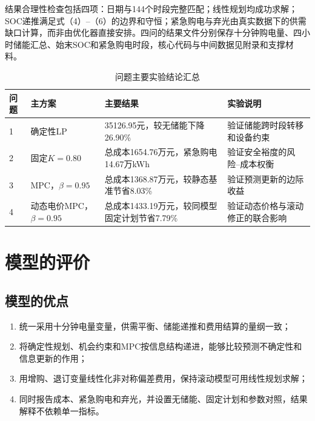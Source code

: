 \documentclass{cumcmthesis}
\begin{document}
结果合理性检查包括四项：日期与144个时段完整匹配；线性规划均成功求解；SOC递推满足式（4）--（6）的边界和守恒；紧急购电与弃光由真实数据下的供需缺口计算，而非由优化器直接安排。四问的结果文件分别保存十分钟购电量、四小时储能汇总、始末SOC和紧急购电时段，核心代码与中间数据见附录和支撑材料。


\begin{table}[H]
\centering
\normalsize
\setlength{\tabcolsep}{8pt}
\renewcommand\arraystretch{1.25}
\caption{问题主要实验结论汇总}
\label{tab:overallresult}
\begin{tabular}{p{1.0cm}p{2.8cm}p{4.1cm}p{4.1cm}}
\toprule
\textbf{问题} & \textbf{主方案} & \textbf{主要结果} & \textbf{实验说明}\\
\midrule
1 & 确定性LP
& 35126.95元，较无储能下降26.90\%
& 验证储能跨时段转移和设备约束\\

2 & 固定$K=0.80$
& 总成本1654.76万元，紧急购电14.67万kWh
& 验证安全裕度的风险--成本权衡\\

3 & MPC，$\beta=0.95$
& 总成本1368.87万元，较静态基准节省8.03\%
& 验证预测更新的边际收益\\

4 & 动态电价MPC，$\beta=0.95$
& 总成本1433.19万元，较同模型固定计划节省7.79\%
& 验证动态价格与滚动修正的联合影响\\
\bottomrule
\end{tabular}
\end{table}

\section{模型的评价}

\subsection{模型的优点}

\begin{enumerate}
    \item 统一采用十分钟电量变量，供需平衡、储能递推和费用结算的量纲一致；
    \item 将确定性规划、机会约束和MPC按信息结构递进，能够比较预测不确定性和信息更新的作用；
    \item 用增购、退订变量线性化非对称偏差费用，保持滚动模型可用线性规划求解；
    \item 同时报告成本、紧急购电和弃光，并设置无储能、固定计划和参数对照，结果解释不依赖单一指标。
\end{enumerate}
\end{document}
